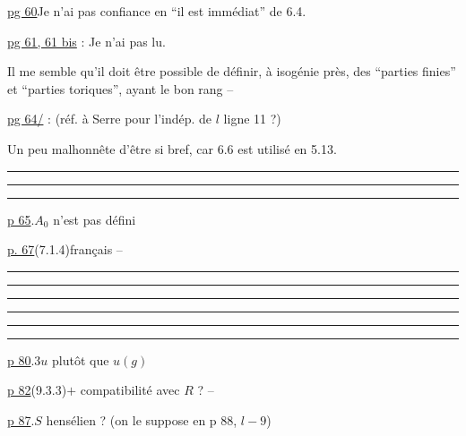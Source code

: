 
\uline{pg 60}\qquad Je n'ai pas confiance en ``il est immédiat'' de 6.4.


\uline{pg 61, 61 bis} : Je n'ai pas lu.

Il me semble qu'il doit être possible de définir, à isogénie près, des ``parties finies'' et ``parties toriques'', ayant le bon rang --


\uline{pg 64/} :  (réf. à Serre pour l'indép. de $l$ ligne 11 ?)

Un peu malhonnête d'être si bref, car 6.6 est utilisé en 5.13.


\hrule\smallskip\hrule\smallskip\hrule

\quad \uline{p 65}.\qquad $A_0$ n'est pas défini\qquad {}

\uline{p. 67}\qquad (7.1.4)\qquad français --

\hrule\smallskip\hrule\smallskip\hrule


\hrule\smallskip\hrule\smallskip\hrule

\quad \uline{p 80}.3\qquad $u$ plutôt que $u(g)$

\uline{p 82}\qquad (9.3.3)\qquad $+$ compatibilité avec $R$ ? --

\uline{p 87}.\qquad $S$  hensélien ? (on le suppose en p 88, $l-9$)

